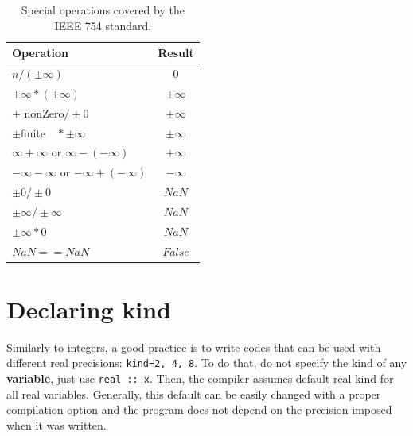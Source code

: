 \begin{table}
    \centering
    \begin{tabular}{| l | c |}
        \hline
        Operation & Result \\ \hline
        $ n / \left(\pm \infty\right) $            &     $	0$              \\ \hline
        $\pm \infty * \left( \pm \infty\right) $    &     $	\pm \infty$      \\ \hline
        $\pm$ nonZero$ / \pm 0 $            &    $	\pm \infty$       \\ \hline
        $\pm $finite$\quad * \pm \infty $      &    $	\pm \infty$       \\ \hline
        $\infty+\infty$  or  $\infty- \left(-\infty\right) $	     &       $+\infty$\\ \hline    
        $-\infty - \infty$   or  $-\infty + \left( -\infty \right) $   &        $	-\infty$\\ \hline
        $\pm 0 / \pm 0 $                  &        $	NaN$         \\ \hline
        $\pm \infty / \pm \infty $    &        $	NaN$     \\ \hline
        $\pm \infty * 0 $            &        $	NaN$     \\ \hline
        $ NaN == NaN $               &    $	False $      \\ \hline
    \end{tabular}
    \caption{Special operations covered by the IEEE 754 standard.}
    \label{tab:SpecialOperations}
\end{table}





    \section{Declaring kind} 


Similarly to integers, a good practice is to write codes that can be used with different real precisions:
\texttt{kind=2, 4, 8}. To do that, do not specify the kind of any \textbf{variable}, just use \texttt{real :: x}. 
Then, the compiler assumes default real kind for all real variables. 
Generally, this default can be easily changed with a proper compilation option and 
the program does not depend on the precision imposed when it was written. 

